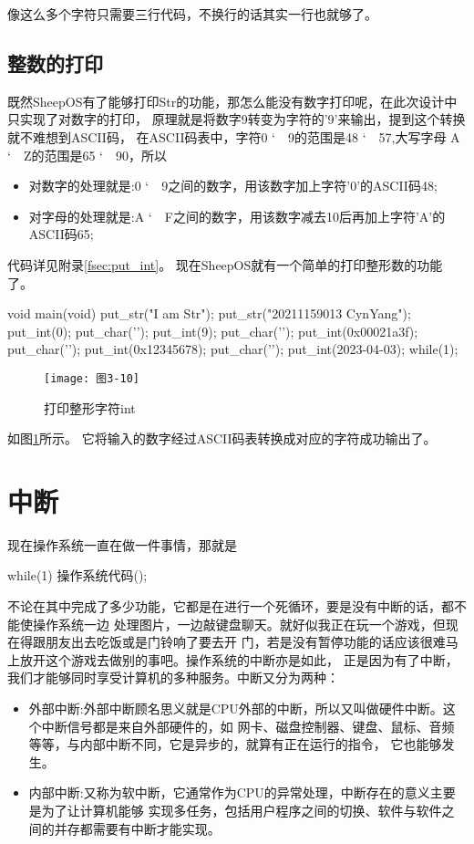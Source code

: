 像这么多个字符只需要三行代码，不换行的话其实一行也就够了。

\subsection{整数的打印}
\label{subsec:int}
既然SheepOS有了能够打印Str的功能，那怎么能没有数字打印呢，在此次设计中只实现了对数字的打印，
原理就是将数字9转变为字符的'9'来输出，提到这个转换就不难想到ASCII码，
在ASCII码表中，字符0 \char`~\, 9的范围是48 \char`~\, 57,大写字母
A \char`~\, Z的范围是65 \char`~\, 90，所以
\begin{itemize}
\item 对数字的处理就是:0 \char`~\, 9之间的数字，用该数字加上字符'0'的ASCII码48;
\item 对字母的处理就是:A \char`~\, F之间的数字，用该数字减去10后再加上字符'A'的ASCII码65;
\end{itemize}
代码详见附录\ref{fsec:put_int}。
现在SheepOS就有一个简单的打印整形数的功能了。

\begin{ccode}
void main(void)
{
   put_str("I am Str\n");
   put_str("20211159013 CynYang\n");
   put_int(0);
   put_char('\n');
   put_int(9);
   put_char('\n');
   put_int(0x00021a3f);
   put_char('\n');
   put_int(0x12345678);
   put_char('\n');
   put_int(2023-04-03);
   while(1);
}
\end{ccode}

\begin{figure}[H]
  \centering
  \texttt{[image: 图3-10]}
  \caption{打印整形字符int}
  \label{fig:print_int}
\end{figure}
如图\ref{fig:print_int}所示。
它将输入的数字经过ASCII码表转换成对应的字符成功输出了。

\section{中断}
\label{sec:interrupt}

现在操作系统一直在做一件事情，那就是
\begin{codeblock}
\begin{ccode}
while(1)
{
  操作系统代码();
}
\end{ccode}  
\end{codeblock}
不论在其中完成了多少功能，它都是在进行一个死循环，要是没有中断的话，都不能使操作系统一边
处理图片，一边敲键盘聊天。就好似我正在玩一个游戏，但现在得跟朋友出去吃饭或是门铃响了要去开
门，若是没有暂停功能的话应该很难马上放开这个游戏去做别的事吧。操作系统的中断亦是如此，
正是因为有了中断，我们才能够同时享受计算机的多种服务。中断又分为两种：
\begin{itemize}
\item 外部中断:外部中断顾名思义就是CPU外部的中断，所以又叫做硬件中断。这个中断信号都是来自外部硬件的，如
网卡、磁盘控制器、键盘、鼠标、音频等等，与内部中断不同，它是异步的，就算有正在运行的指令，
它也能够发生。
\item 内部中断:又称为软中断，它通常作为CPU的异常处理，中断存在的意义主要是为了让计算机能够
  实现多任务，包括用户程序之间的切换、软件与软件之间的并存都需要有中断才能实现。
\end{itemize}

